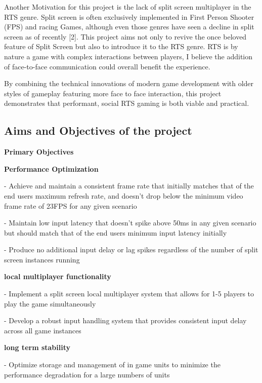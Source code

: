 \documentclass[]{final_report}
\begin{document}
Another Motivation for this project is the lack of split screen multiplayer in the RTS genre. Split screen is often exclusively implemented in First Person Shooter (FPS) and racing Games, although even those genres have seen a decline in split screen as of recently [2]. This project aims not only to revive the once beloved feature of Split Screen but also to introduce it to the RTS genre. RTS is by nature a game with complex interactions between players, I believe the addition of face-to-face communication could overall benefit the experience. \newline

By combining the technical innovations of modern game development with older styles of gameplay featuring more face to face interaction, this project demonstrates that performant, social RTS gaming is both viable and practical.

\subsection{ Aims and Objectives of the project}

 \textbf{Primary Objectives} \newline

\textbf{Performance Optimization} \newline

 - Achieve and maintain a consistent frame rate that initially matches that of the end users maximum refresh rate, and doesn't drop below the minimum video frame rate of 23FPS for any given scenario 

 - Maintain low input latency that doesn’t spike above 50ms in any given scenario but should match that of the end users minimum input latency initially

 - Produce no additional input delay or lag spikes regardless of the number of split screen instances running

 \textbf{local multiplayer functionality} \newline

 - Implement a split screen local multiplayer system that allows for 1-5 players to play the game simultaneously

 - Develop a robust input handling system that provides consistent input delay across all game instances

 \textbf{long term stability} \newline

 - Optimize storage and management of in game units to minimize the performance degradation for a large numbers of units
\end{document}
